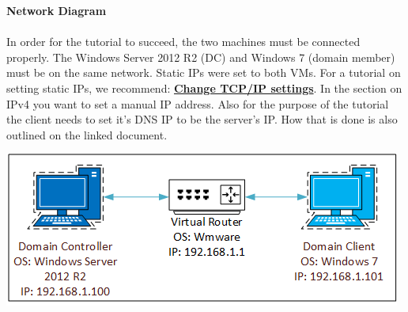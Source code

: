\documentclass[12pt]{extarticle}
\begin{document}
\pagebreak
\noindent
\textbf{Network Diagram}\\\\
In order for the tutorial to succeed, the two machines must be connected properly. The Windows Server 2012 R2 (DC) and Windows 7 (domain member) must be on the same network. Static IPs were set to both VMs. For a tutorial on setting static IPs, we recommend: \href{https://support.microsoft.com/en-us/help/15089/windows-change-tcp-ip-settings}{\textbf{Change TCP/IP settings}}. In the section on IPv4 you want to set a manual IP address. Also for the purpose of the tutorial the client needs to set it's DNS IP to be the server's IP. How that is done is also outlined on the linked document. \cite{StaticIP}
\vspace*{20mm}\\
\begin{center}
\includegraphics{NetworkDiagram}
\end{center}
\end{document}
